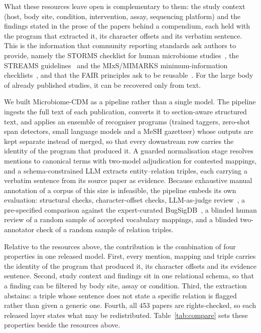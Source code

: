 \documentclass[referee,lineno,pdflatex,sn-vancouver-num]{sn-jnl}
\theoremstyle{thmstyleone}%
\theoremstyle{thmstyletwo}%
\theoremstyle{thmstylethree}%
\begin{document}
What these resources leave open is complementary to them: the study context
(host, body site, condition, intervention, assay, sequencing platform) and the
findings stated in the prose of the papers behind a compendium, each held with
the program that extracted it, its character offsets and its verbatim sentence.
This is the information that community reporting standards ask authors to
provide, namely the STORMS checklist for human microbiome
studies~\cite{mirzayi2021storms}, the STREAMS guidelines~\cite{kelliher2025streams}
and the MIxS/MIMARKS minimum-information checklists~\cite{yilmaz2011mixs}, and
that the FAIR principles ask to be reusable~\cite{wilkinson2016fair}. For the
large body of already published studies, it can be recovered only from text.

We built Microbiome-CDM as a pipeline rather than a single model. The pipeline
ingests the full text of each publication, converts it to section-aware structured
text, and applies an ensemble of recogniser programs (trained taggers, zero-shot
span detectors, small language models and a MeSH gazetteer) whose outputs are kept
separate instead of merged, so that every downstream row carries the identity of the
program that produced it. A guarded normalisation stage resolves mentions to
canonical terms with two-model adjudication for contested mappings, and a
schema-constrained LLM extracts entity--relation triples, each carrying a verbatim
sentence from its source paper as evidence. Because exhaustive manual annotation
of a corpus of this size is infeasible, the pipeline embeds its own evaluation:
structural checks, character-offset checks, LLM-as-judge
review~\cite{zheng2023mtbench}, a pre-specified comparison against the
expert-curated BugSigDB~\cite{geistlinger2023}, a blinded human review of a
random sample of accepted vocabulary mappings, and a blinded two-annotator check
of a random sample of relation triples.

Relative to the resources above, the contribution is the combination of four
properties in one released model. First, every mention, mapping and triple
carries the identity of the program that produced it, its character offsets and
its evidence sentence. Second, study context and findings sit in one relational
schema, so that a finding can be filtered by body site, assay or condition.
Third, the extraction abstains: a triple whose sentence does not state a
specific relation is flagged rather than given a generic one. Fourth, all 453
papers are rights-checked, so each released layer states what may be
redistributed. Table~\ref{tab:compare} sets these properties beside the
resources above.
\end{document}
